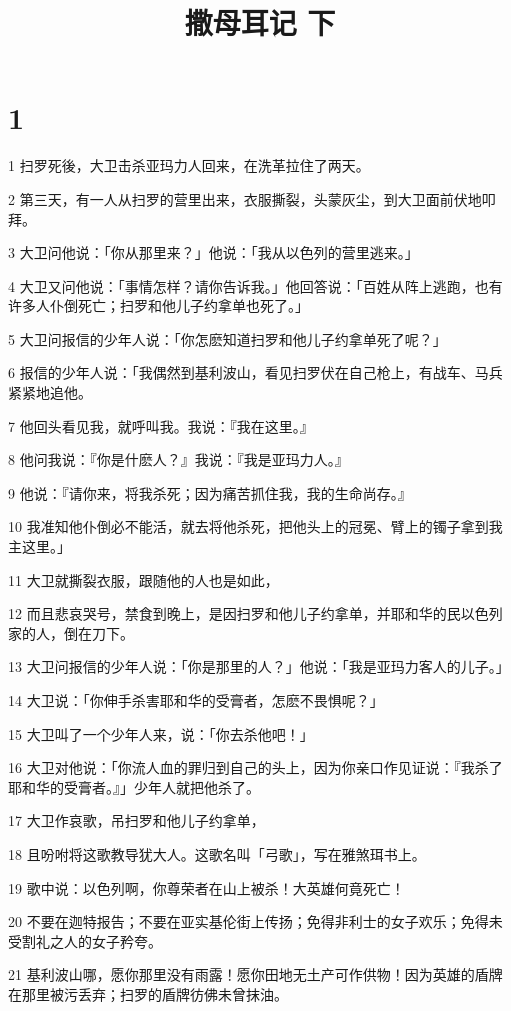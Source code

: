 

\title{撒母耳记 下}


\chapter{1}

\par 1 扫罗死後，大卫击杀亚玛力人回来，在洗革拉住了两天。
\par 2 第三天，有一人从扫罗的营里出来，衣服撕裂，头蒙灰尘，到大卫面前伏地叩拜。
\par 3 大卫问他说：「你从那里来？」他说：「我从以色列的营里逃来。」
\par 4 大卫又问他说：「事情怎样？请你告诉我。」他回答说：「百姓从阵上逃跑，也有许多人仆倒死亡；扫罗和他儿子约拿单也死了。」
\par 5 大卫问报信的少年人说：「你怎麽知道扫罗和他儿子约拿单死了呢？」
\par 6 报信的少年人说：「我偶然到基利波山，看见扫罗伏在自己枪上，有战车、马兵紧紧地追他。
\par 7 他回头看见我，就呼叫我。我说：『我在这里。』
\par 8 他问我说：『你是什麽人？』我说：『我是亚玛力人。』
\par 9 他说：『请你来，将我杀死；因为痛苦抓住我，我的生命尚存。』
\par 10 我准知他仆倒必不能活，就去将他杀死，把他头上的冠冕、臂上的镯子拿到我主这里。」
\par 11 大卫就撕裂衣服，跟随他的人也是如此，
\par 12 而且悲哀哭号，禁食到晚上，是因扫罗和他儿子约拿单，并耶和华的民以色列家的人，倒在刀下。
\par 13 大卫问报信的少年人说：「你是那里的人？」他说：「我是亚玛力客人的儿子。」
\par 14 大卫说：「你伸手杀害耶和华的受膏者，怎麽不畏惧呢？」
\par 15 大卫叫了一个少年人来，说：「你去杀他吧！」
\par 16 大卫对他说：「你流人血的罪归到自己的头上，因为你亲口作见证说：『我杀了耶和华的受膏者。』」少年人就把他杀了。
\par 17 大卫作哀歌，吊扫罗和他儿子约拿单，
\par 18 且吩咐将这歌教导犹大人。这歌名叫「弓歌」，写在雅煞珥书上。
\par 19 歌中说：以色列啊，你尊荣者在山上被杀！大英雄何竟死亡！
\par 20 不要在迦特报告；不要在亚实基伦街上传扬；免得非利士的女子欢乐；免得未受割礼之人的女子矜夸。
\par 21 基利波山哪，愿你那里没有雨露！愿你田地无土产可作供物！因为英雄的盾牌在那里被污丢弃；扫罗的盾牌彷佛未曾抹油。
